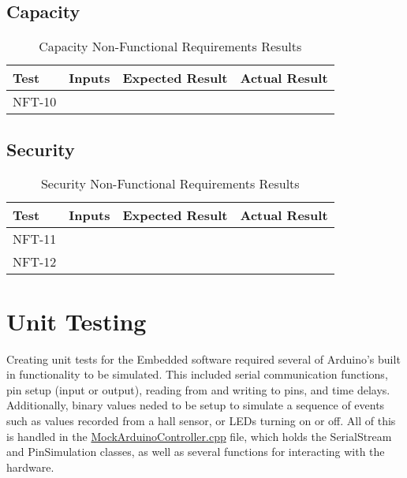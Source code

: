 \documentclass[12pt, titlepage]{article}
\begin{document}
\subsection{Capacity}

\begin{table}[H]
  \centering
    \setlength{\leftmargini}{0cm}
    \begin{tabular}{| >{\centering\arraybackslash}m{1.5cm} | 
      >{\centering\arraybackslash}m{4cm} | 
      >{\centering\arraybackslash}m{4cm} | 
      >{\centering\arraybackslash}m{4cm} |}
    \hline
    \rowcolor[gray]{0.9}
    Test & Inputs & Expected Result & Actual Result\\
    \hline
    NFT-10 &  &  & \\
    \hline
    \end{tabular}
  \caption{Capacity Non-Functional Requirements Results}
\end{table}

\subsection{Security}

\begin{table}[H]
  \centering
    \setlength{\leftmargini}{0cm}
    \begin{tabular}{| >{\centering\arraybackslash}m{1.5cm} | 
      >{\centering\arraybackslash}m{4cm} | 
      >{\centering\arraybackslash}m{4cm} | 
      >{\centering\arraybackslash}m{4cm} |}
    \hline
    \rowcolor[gray]{0.9}
    Test & Inputs & Expected Result & Actual Result\\
    \hline
    NFT-11 &  &  & \\
    \hline
    NFT-12 &  &  & \\
    \hline
    \end{tabular}
  \caption{Security Non-Functional Requirements Results}
\end{table}

\section{Unit Testing}

  Creating unit tests for the Embedded software required several of Arduino's built in functionality to be simulated. This included serial communication functions,
  pin setup (input or output), reading from and writing to pins, and time delays. Additionally, binary values neded to be setup to simulate a sequence of events 
  such as values recorded from a hall sensor, or LEDs turning on or off. All of this is handled in the 
  \href{../../test/EmbeddedTest/ArduinoTest/MockArduinoController.cpp}{MockArduinoController.cpp} file, which holds the SerialStream and PinSimulation classes,
  as well as several functions for interacting with the hardware.
\end{document}
